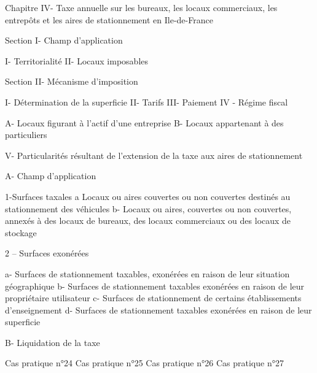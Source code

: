 Chapitre IV- Taxe annuelle sur les bureaux, les locaux commerciaux, les entrepôts et les aires de stationnement en Ile-de-France

	Section I- Champ d'application

		I- Territorialité 
		II- Locaux imposables 

	Section II- Mécanisme d’imposition 

I- Détermination de la superficie
II- Tarifs
III- Paiement 
IV - Régime fiscal 

A- Locaux figurant à l'actif d'une entreprise
B- Locaux appartenant à des particuliers

V- Particularités résultant de l’extension de la taxe aux aires de stationnement

	A- Champ d’application
	
		1-Surfaces taxales
a Locaux ou aires couvertes ou non couvertes destinés au stationnement des véhicules
b- Locaux ou aires, couvertes ou non couvertes, annexés à des locaux de bureaux, des locaux commerciaux ou des locaux de stockage 

		2 – Surfaces exonérées 

a-	Surfaces de stationnement taxables, exonérées en raison de leur situation géographique
b-	Surfaces de stationnement taxables exonérées en raison de leur propriétaire utilisateur
c-	Surfaces de stationnement de certains établissements d’enseignement
d-	Surfaces de stationnement taxables exonérées en raison de leur superficie

B- Liquidation de la taxe 

Cas pratique n°24 
Cas pratique n°25
Cas pratique n°26
Cas pratique n°27
